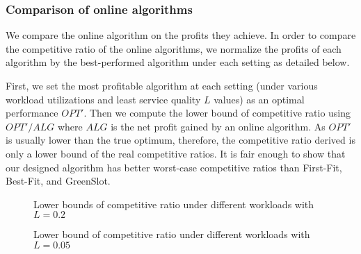 \documentclass[conference]{IEEEtran}
\begin{document}
\subsubsection{Comparison of online algorithms}


















We compare the online algorithm on the profits they achieve. In order to compare the competitive ratio of the online algorithms, we normalize the profits of each algorithm by the best-performed algorithm under each setting as detailed below.


First, we set the most profitable algorithm at each setting (under various workload utilizations and least service quality $L$ values) as an optimal performance $OPT'$. Then we compute the lower bound of competitive ratio using $OPT' / ALG$ where $ALG$ is the net profit gained by an online algorithm. As $OPT'$ is usually lower than the true optimum, therefore, the competitive ratio derived is only a lower bound of the real competitive ratios. It is fair enough to show that our designed  algorithm has better worst-case competitive ratios than First-Fit, Best-Fit, and GreenSlot.



\begin{figure}
  \centering
\caption{Lower bounds of competitive ratio  under different workloads \newline with $L = 0.2$}
\label{fig:prfits_0.2}
\end{figure}


\begin{figure}
  \centering
\caption{Lower bound of competitive ratio under different workloads \newline with $L = 0.05$}
\label{fig:prfits_0.05}
\end{figure}
\end{document}
